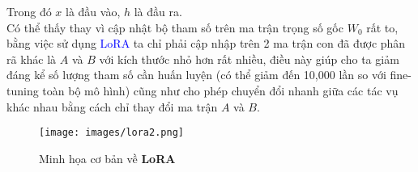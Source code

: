 {Trong đó $x$ là đầu vào, $h$ là đầu ra. \\

Có thể thấy thay vì cập nhật bộ tham số trên ma trận trọng số gốc $W_0$ rất to, bằng việc sử dụng \textcolor{blue}{LoRA} ta chỉ phải cập nhập trên 2 ma trận con đã được phân rã khác là $A$ và $B$ với kích thước nhỏ hơn rất nhiều, điều này giúp cho ta giảm đáng kể số lượng tham số cần huấn luyện (có thể giảm đến 10,000 lần so với fine-tuning toàn bộ mô hình) cũng như cho phép chuyển đổi nhanh giữa các tác vụ khác nhau bằng cách chỉ thay đổi ma trận $A$ và $B$.

\begin{figure}[h]
    \centering
    \texttt{[image: images/lora2.png]}
    \caption{Minh họa cơ bản về \textbf{LoRA}}
    \label{fig:your-label}
\end{figure} 

}